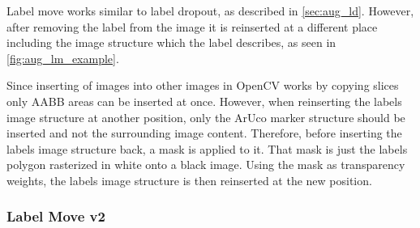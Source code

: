 \documentclass[10pt]{book}
\begin{document}
Label move works similar to label dropout, as described in \autoref{sec:aug_ld}. However, after removing the label from the image it is reinserted at a different place including the image structure which the label describes, as seen in \autoref{fig:aug_lm_example}. 

Since inserting of images into other images in OpenCV works by copying slices only \ac{AABB} areas can be inserted at once. However, when reinserting the labels image structure at another position, only the \ac{ArUco} marker structure should be inserted and not the surrounding image content. Therefore, before inserting the labels image structure back, a mask is applied to it. That mask is just the labels polygon rasterized in white onto a black image. Using the mask as transparency weights, the labels image structure is then reinserted at the new position.

\subsubsection{Label Move v2}
\end{document}
